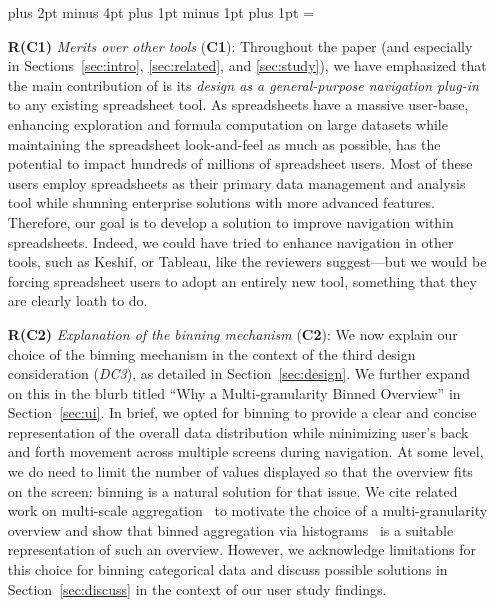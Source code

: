\begin{itemize}
\leftmargin=25pt \rightmargin=0pt   \itemindent=0pt \listparindent=0pt \topsep=0pt plus 2pt minus 4pt \partopsep=0pt plus 1pt minus 1pt \parsep=0pt plus 1pt \itemsep=\parsep

\item[\textbf{R(C1)}] \textit{Merits over other tools} (\textbf{C1}): 
Throughout the paper (and especially in 
Sections~\ref{sec:intro}, \ref{sec:related},
and \ref{sec:study}), we have emphasized
that the main contribution of \noah
is its \emph{design as a general-purpose navigation plug-in} 
to any existing spreadsheet tool. 
As spreadsheets have a massive user-base, 
enhancing exploration and formula computation 
on large datasets while maintaining 
the spreadsheet look-and-feel as much as possible, 
has the potential to impact hundreds of millions 
of spreadsheet users. 
Most of these users employ spreadsheets 
as their primary data management and analysis 
tool while shunning enterprise solutions 
with more advanced features. 
Therefore, our goal is to develop a 
solution to improve navigation within spreadsheets.
Indeed, we could have tried to enhance navigation
in other tools, such as Keshif, or Tableau, like
the reviewers suggest---but we would be forcing
spreadsheet users to adopt an entirely new tool, something
that they are clearly loath to do. 

\item[\textbf{R(C2)}] \textit{Explanation of the binning mechanism} (\textbf{C2}): 
We now explain our choice
of the binning mechanism in 
the context of the third design consideration (\emph{DC3}),
as detailed in Section~\ref{sec:design}.
We further expand on this in the blurb titled 
``Why a Multi-granularity Binned Overview'' 
in Section~\ref{sec:ui}.
In brief, we opted for binning to 
provide a clear and concise 
representation of the overall data 
distribution while minimizing user's back 
and forth movement across multiple screens 
during navigation. 
At some level, we do need to limit the number
of values displayed so that the overview
fits on the screen: binning is a natural solution
for that issue. 
We cite related work on 
multi-scale aggregation~\cite{elmqvist2009hierarchical} 
to motivate the choice of 
a multi-granularity overview
and show that binned aggregation via histograms~\cite{liu2013immens}
is a suitable representation of such an overview.
However, we acknowledge limitations 
for this choice for binning categorical data 
and discuss possible solutions 
in Section~\ref{sec:discuss} 
in the context of our user study findings. 



\end{itemize}
